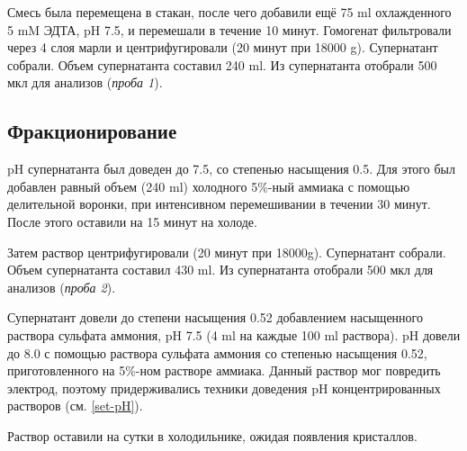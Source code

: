 Смесь была перемещена в стакан, после чего добавили ещё 75 ml охлажденного 5 mM ЭДТА, pH 7.5,
и перемешали в течение 10 минут.
Гомогенат фильтровали через 4 слоя марли и центрифугировали (20 минут при 18000 g).
Супернатант собрали. Объем супернатанта составил 240 ml.
Из супернатанта отобрали 500 мкл для анализов (\emph{проба 1}).

\subsection{Фракционирование}
\label{2-frac-end}
pH супернатанта был доведен до 7.5, со степенью насыщения 0.5.
Для этого был добавлен равный объем (240 ml) холодного 5\%-ный аммиака
с помощью делительной воронки, при интенсивном перемешивании в течении 30 минут.
После этого оставили на 15 минут на холоде.

Затем раствор центрифугировали (20 минут при 18000g).
Супернатант собрали. Объем супернатанта составил 430 ml.
Из супернатанта отобрали 500 мкл для анализов (\emph{проба 2}).

Супернатант довели до степени насыщения 0.52 добавлением
насыщенного раствора сульфата аммония, pH 7.5 (4 ml  на каждые 100 ml раствора).
pH довели до 8.0 с помощью раствора сульфата аммония со степенью насыщения 0.52,
приготовленного на 5\%-ном растворе аммиака.
Данный раствор мог повредить электрод, поэтому придерживались
техники доведения pH концентрированных растворов (см. \ref{set-pH}).

Раствор оставили на сутки в холодильнике, ожидая появления кристаллов.

